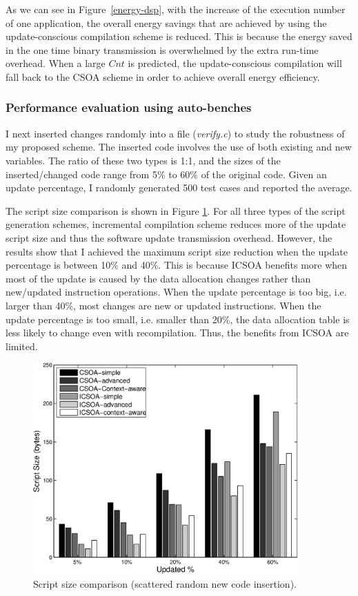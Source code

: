 As we can see in Figure~\ref{energy-dsp}, with the increase of the execution number of one application, the overall 
energy savings that are achieved by using the update-conscious compilation scheme is reduced. This is because the 
energy saved in the one time binary transmission is overwhelmed by the extra run-time overhead. When a large $Cnt$ is 
predicted, the update-conscious compilation will fall back to the CSOA scheme in order to achieve overall energy 
efficiency. 

\subsubsection{Performance evaluation using auto-benches}
I next inserted changes randomly into a file ({\em verify.c}) to study the robustness of my proposed scheme. The 
inserted code involves the use of both existing and new variables. The ratio of these two types is 1:1, and the sizes 
of the inserted/changed code range from 5\% to 60\% of the original code. Given an update percentage, I randomly 
generated 500 test cases and reported the average.

The script size comparison is shown in Figure \ref{upd_rand_bar}. For all three types of the script generation schemes, 
incremental compilation scheme reduces more of the
update script size and thus the software update transmission overhead. However, the results show that I achieved the 
maximum script size reduction when the update percentage is between 10\% and 40\%. This is because ICSOA benefits more 
when most of the update is caused by the data allocation changes rather than new/updated instruction operations. When 
the update percentage is too big, i.e. larger than 40\%, most changes are new or updated instructions. When the update 
percentage is too small, i.e. smaller than 20\%, the data allocation table is less likely to change even with 
recompilation. Thus, the benefits from ICSOA are limited.


\begin{figure}[htbp]
\begin{center}
\includegraphics[width=4in]{./figures/upd_rand_bar.eps}
\caption{Script size comparison (scattered random new code insertion).}
\label{upd_rand_bar}
\end{center}
\vspace{-0.2in}
\end{figure}

